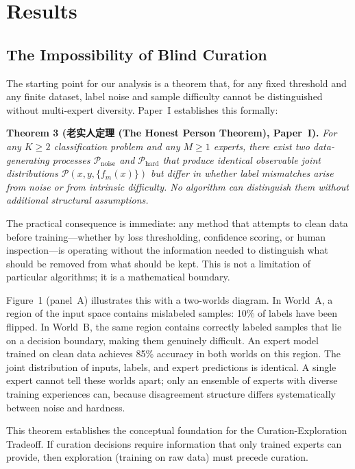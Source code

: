 \documentclass[12pt,a4paper]{article}
\begin{document}
\section{Results}

\subsection{The Impossibility of Blind Curation}

The starting point for our analysis is a theorem that, for any fixed threshold and any finite dataset, label noise and sample difficulty cannot be distinguished without multi-expert diversity. Paper~I establishes this formally:

\noindent\textbf{Theorem 3 (老实人定理 (The Honest Person Theorem), Paper~I).} \emph{For any $K \geq 2$ classification problem and any $M \geq 1$ experts, there exist two data-generating processes $\mathcal{P}_{\text{noise}}$ and $\mathcal{P}_{\text{hard}}$ that produce identical observable joint distributions $\mathcal{P}(x, y, \{f_m(x)\})$ but differ in whether label mismatches arise from noise or from intrinsic difficulty. No algorithm can distinguish them without additional structural assumptions.}

The practical consequence is immediate: any method that attempts to clean data before training---whether by loss thresholding, confidence scoring, or human inspection---is operating without the information needed to distinguish what should be removed from what should be kept. This is not a limitation of particular algorithms; it is a mathematical boundary.

Figure~1 (panel~A) illustrates this with a two-worlds diagram. In World~A, a region of the input space contains mislabeled samples: 10\% of labels have been flipped. In World~B, the same region contains correctly labeled samples that lie on a decision boundary, making them genuinely difficult. An expert model trained on clean data achieves 85\% accuracy in both worlds on this region. The joint distribution of inputs, labels, and expert predictions is identical. A single expert cannot tell these worlds apart; only an ensemble of experts with diverse training experiences can, because disagreement structure differs systematically between noise and hardness.

This theorem establishes the conceptual foundation for the Curation-Exploration Tradeoff. If curation decisions require information that only trained experts can provide, then exploration (training on raw data) must precede curation.
\end{document}
